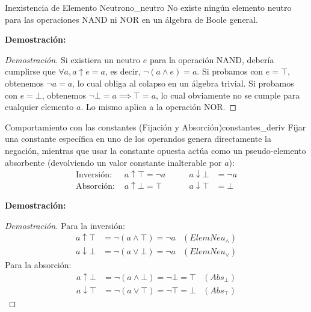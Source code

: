 \documentclass[12pt,a4paper]{article}
\newcommand{\desplegable}[2]{%
  \par\vspace{1ex}\noindent
  \textbf{Demostración:}
  \vspace{1ex}
  
  #2
  \par\vspace{1ex}
}
\begin{document}
\begin{teorema}{Inexistencia de Elemento Neutro}{no_neutro}
No existe ningún elemento neutro para las operaciones NAND ni NOR en un álgebra de Boole general.
\end{teorema}
\desplegable{proof_no_neutro}{
\begin{proof}[Demostración]
Si existiera un neutro $e$ para la operación NAND, debería cumplirse que $\forall a, a \uparrow e = a$, es decir, $\neg(a \wedge e) = a$. Si probamos con $e=\top$, obtenemos $\neg a = a$, lo cual obliga al colapso en un álgebra trivial. Si probamos con $e=\bot$, obtenemos $\neg \bot = a \implies \top = a$, lo cual obviamente no se cumple para cualquier elemento $a$. Lo mismo aplica a la operación NOR.
\end{proof}
}

\begin{teorema}{Comportamiento con las constantes (Fijación y Absorción)}{constantes_deriv}
Fijar una constante específica en uno de los operandos genera directamente la negación, mientras que usar la constante opuesta actúa como un pseudo-elemento absorbente (devolviendo un valor constante inalterable por $a$):
\begin{align*}
    \text{Inversión: } & a \uparrow \top = \neg a \qquad & a \downarrow \bot &= \neg a \\
    \text{Absorción: } & a \uparrow \bot = \top \qquad & a \downarrow \top &= \bot
\end{align*}
\end{teorema}
\desplegable{proof_constantes_deriv}{
\begin{proof}[Demostración]
Para la inversión:
\begin{align*}
    a \uparrow \top &= \neg(a \wedge \top) = \neg a & (ElemNeu_\wedge) \\
    a \downarrow \bot &= \neg(a \vee \bot) = \neg a & (ElemNeu_\vee)
\end{align*}
Para la absorción:
\begin{align*}
    a \uparrow \bot &= \neg(a \wedge \bot) = \neg \bot = \top & (Abs_\bot) \\
    a \downarrow \top &= \neg(a \vee \top) = \neg \top = \bot & (Abs_\top)
\end{align*}
\end{proof}
}
\end{document}

